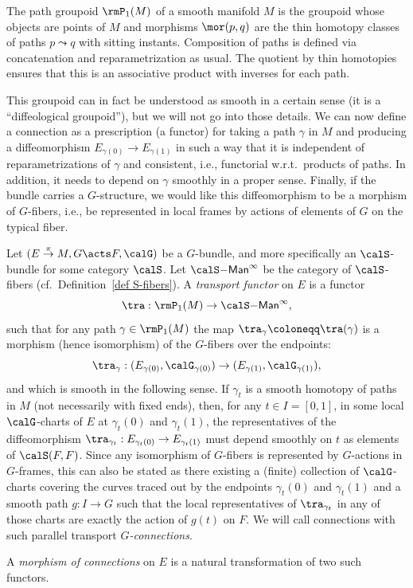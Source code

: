\begin{defn}
    The path groupoid $\rmP_1(M)$ of a smooth manifold $M$ is the groupoid whose objects are points of $M$ and morphisms $\mor(p,q)$ are the thin homotopy classes of paths $p\leadsto q$ with sitting instants. Composition of paths is defined via concatenation and reparametrization as usual. The quotient by thin homotopies ensures that this is an associative product with inverses for each path.
\end{defn}

This groupoid can in fact be understood as smooth in a certain sense (it is a ``diffeological groupoid''), but we will not go into those details. We can now define a connection as a prescription (a functor) for taking a path $\gamma$ in $M$ and producing a diffeomorphism $E_{\gamma(0)}\to E_{\gamma(1)}$ in such a way that it is independent of reparametrizations of $\gamma$ and consistent, i.e., functorial w.r.t.\ products of paths. In addition, it needs to depend on $\gamma$ smoothly in a proper sense. Finally, if the bundle carries a $G$-structure, we would like this diffeomorphism to be a morphism of $G$-fibers, i.e., be represented in local frames by actions of elements of $G$ on the typical fiber.

\begin{defn}
    Let $(E\overset{\pi}{\to}M,G\acts F,\calG)$ be a $G$-bundle, and more specifically an $\calS$-bundle for some category $\calS$. Let $\calS\mathsf{-Man}^\infty$ be the category of $\calS$-fibers (cf.~Definition~\ref{def S-fibers}). A \emph{transport functor} on $E$ is a functor
    \[\tra: \rmP_1(M)\to \calS\mathsf{-Man}^\infty,\]
    such that for any path $\gamma\in\rmP_1(M)$ the map $\tra_\gamma\coloneqq \tra(\gamma)$ is a morphism (hence isomorphism) of the $G$-fibers over the endpoints:
    \[\tra_\gamma:(E_{\gamma(0)},\calG_{\gamma(0)})\to (E_{\gamma(1)},\calG_{\gamma(1)}),\]
    and which is smooth in the following sense. If $\gamma_t$ is a smooth homotopy of paths in $M$ (not necessarily with fixed ends), then, for any $t\in I=[0,1]$, in some local $\calG$-charts of $E$ at $\gamma_t(0)$ and $\gamma_t(1)$, the representatives of the diffeomorphism $\tra_{\gamma_t}:E_{\gamma_t(0)}\to E_{\gamma_t(1)}$ must depend smoothly on $t$ as elements of $\calS(F,F)$. Since any isomorphism of $G$-fibers is represented by $G$-actions in $G$-frames, this can also be stated as there existing a (finite) collection of $\calG$-charts covering the curves traced out by the endpoints $\gamma_t(0)$ and $\gamma_t(1)$ and a smooth path $g:I\to G$ such that the local representatives of $\tra_{\gamma_t}$ in any of those charts are exactly the action of $g(t)$ on $F$. We will call connections with such parallel transport \emph{$G$-connections}.

    A \emph{morphism of connections} on $E$ is a natural transformation of two such functors.
\end{defn}

